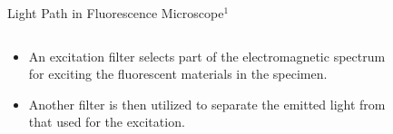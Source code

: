 \begin{frame}{Light Path in Fluorescence Microscope$^1$}
	\begin{columns}[T,onlytextwidth]
		\begin{column}{0.4\textwidth}
			\begin{itemize}
				\item<1-> An excitation filter selects part of the electromagnetic spectrum for exciting the fluorescent materials in the specimen.
				\item<2-> Another filter is then utilized to separate the emitted light from that used for the excitation.
			\end{itemize}
		\end{column}

		\begin{column}{0.6\textwidth}
			\centering
			\bigskip
			\vspace{-10mm}
			\begin{figure}
				\def\svgwidth{0.7\columnwidth}
				
			\end{figure}
		\end{column}
	\end{columns}
\end{frame}
